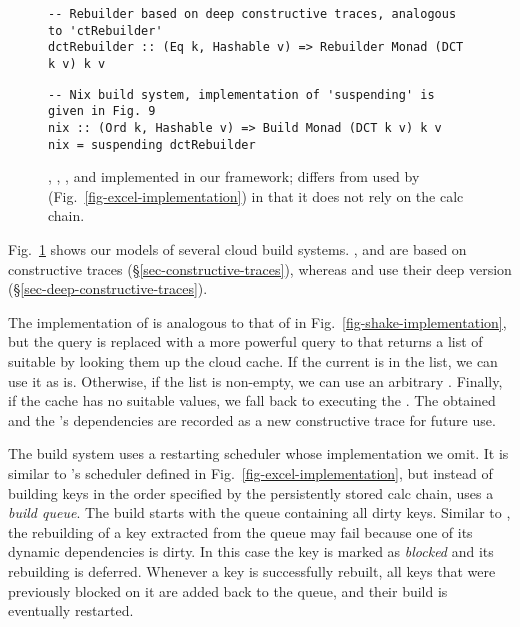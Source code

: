 \begin{figure}
\vspace{0mm}
\begin{verbatim}
-- Rebuilder based on deep constructive traces, analogous to 'ctRebuilder'
dctRebuilder :: (Eq k, Hashable v) => Rebuilder Monad (DCT k v) k v
\end{verbatim}
\vspace{0mm}
\begin{verbatim}
-- Nix build system, implementation of 'suspending' is given in Fig. 9
nix :: (Ord k, Hashable v) => Build Monad (DCT k v) k v
nix = suspending dctRebuilder
\end{verbatim}
\vspace{-2mm}
\caption{\Bazel, \Cloud \Shake, \CloudBuild, \Buck and \Nix implemented in
our framework;  differs from  used by \Excel
(Fig.~\ref{fig-excel-implementation}) in that it does not rely on the calc
chain.}
\label{fig-cloud-implementations}
\vspace{-2mm}
\end{figure}

Fig.~\ref{fig-cloud-implementations} shows our models of several cloud build
systems. \Bazel, \CloudBuild and \Cloud \Shake are based on constructive traces
(\S\ref{sec-constructive-traces}), whereas \Buck and \Nix use their deep
version (\S\ref{sec-deep-constructive-traces}).

The implementation of  is analogous to that of 
in Fig.~\ref{fig-shake-implementation}, but the  query is replaced
with a more powerful query to  that returns a list of suitable
 by looking them up the cloud cache. If the current 
is in the list, we can use it as is. Otherwise, if the list is non-empty, we can
use an arbitrary . Finally, if the cache has no suitable values,
we fall back to executing the . The obtained  and the
's dependencies are recorded as a new constructive trace for future
use.

The \Bazel build system uses a restarting scheduler whose implementation we
omit. It is similar to \Excel's  scheduler defined in
Fig.~\ref{fig-excel-implementation}, but instead of building keys in the order
specified by the persistently stored calc chain, \Bazel uses a \emph{build
queue}. The build starts with the queue containing all dirty keys. Similar to
\Excel, the rebuilding of a key extracted from the queue may fail because one of
its dynamic dependencies is dirty. In this case the key is marked as
\emph{blocked} and its rebuilding is deferred. Whenever a key is successfully
rebuilt, all keys that were previously blocked on it are added back to the
queue, and their build is eventually restarted.

